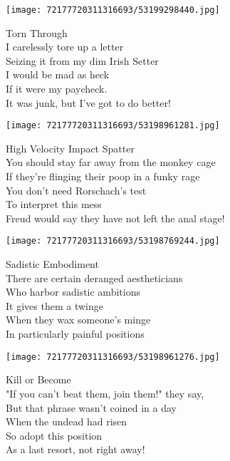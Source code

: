 \documentclass[10pt,letterpaper]{article}
\begin{document}
\begin{center}\texttt{[image: 72177720311316693/53199298440.jpg]}
\end{center}
\begin{center}
Torn Through\\
\vskip 0.2in
I carelessly tore up a letter\\
Seizing it from my dim Irish Setter\\
I would be mad as heck\\
If it were my paycheck.\\
It was junk, but I've got to do better!\\
\end{center}
\pagebreak

\begin{center}
\texttt{[image: 72177720311316693/53198961281.jpg]}
\end{center}

\begin{center}
High Velocity Impact Spatter\\
\vskip 0.2in
You should stay far away from the monkey cage\\
If they're flinging their poop in a funky rage\\
You don't need Rorschach's test\\
To interpret this mess\\
Freud would say they have not left the anal stage!\\
\end{center}
\pagebreak

\begin{center}\texttt{[image: 72177720311316693/53198769244.jpg]}
\end{center}
\begin{center}
Sadistic Embodiment\\
\vskip 0.2in
There are certain deranged aestheticians\\
Who harbor sadistic ambitions\\
It gives them a twinge\\
When they wax someone's minge\\
In particularly painful positions\\
\end{center}
\pagebreak

\begin{center}\texttt{[image: 72177720311316693/53198961276.jpg]}
\end{center}
\begin{center}
Kill or Become\\
\vskip 0.2in
"If you can't beat them, join them!" they say,\\
But that phrase wasn't coined in a day\\
When the undead had risen\\
So adopt this position\\
As a last resort, not right away!\\
\end{center}
\pagebreak
\end{document}

